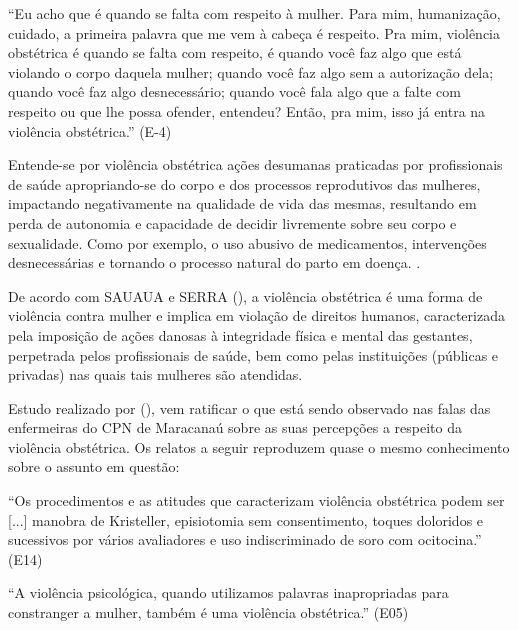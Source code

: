 \begin{citacao}
``Eu acho que é quando se falta com respeito à mulher. Para mim, humanização, cuidado, a primeira palavra que me vem à cabeça é respeito. Pra mim, violência obstétrica é quando se falta com respeito, é quando você faz algo que está violando o corpo daquela mulher; quando você faz algo sem a autorização dela; quando você faz algo desnecessário; quando você fala algo que a  falte com respeito ou que lhe possa ofender, entendeu? Então, pra mim, isso já entra na violência obstétrica.'' (E-4)
\end{citacao}

Entende-se por violência obstétrica ações desumanas praticadas por profissionais de saúde apropriando-se do corpo e dos processos reprodutivos das mulheres, impactando negativamente na qualidade de vida das mesmas, resultando em perda de autonomia e capacidade de decidir livremente sobre seu corpo e sexualidade. Como por exemplo, o uso abusivo de medicamentos, intervenções desnecessárias e tornando o processo natural do parto em doença. \cite[p. 3]{diniz2015abuse}.

De acordo com SAUAUA e SERRA (\citeyear{sauaia2016dor}), a violência obstétrica é uma forma de violência contra mulher e implica em violação de direitos humanos, caracterizada pela imposição de ações danosas à integridade física e mental das gestantes, perpetrada pelos profissionais de saúde, bem como pelas instituições (públicas e privadas) nas quais tais mulheres são atendidas. 

Estudo realizado por \citeauthor{leal2018percepccao} (\citeyear{leal2018percepccao}), vem ratificar o que está sendo observado nas falas das enfermeiras do CPN de Maracanaú sobre as suas percepções a respeito da violência obstétrica. Os relatos a seguir reproduzem quase o mesmo conhecimento sobre o assunto em questão: 

\begin{citacao}
``Os procedimentos e as atitudes que caracterizam violência obstétrica podem ser [...] manobra de Kristeller, episiotomia sem consentimento, toques doloridos e sucessivos por vários avaliadores e uso indiscriminado de soro com ocitocina.'' (E14) 
\end{citacao}

\begin{citacao}
``A violência psicológica, quando utilizamos palavras inapropriadas para constranger a mulher, também é uma violência obstétrica.'' (E05) 
\end{citacao}

